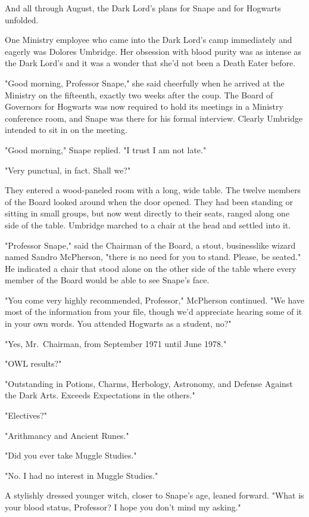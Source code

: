 And all through August, the Dark Lord's plans for Snape and for Hogwarts unfolded.

One Ministry employee who came into the Dark Lord's camp immediately and eagerly was Dolores Umbridge. Her obsession with blood purity was as intense as the Dark Lord's and it was a wonder that she'd not been a Death Eater before.

"Good morning, Professor Snape," she said cheerfully when he arrived at the Ministry on the fifteenth, exactly two weeks after the coup. The Board of Governors for Hogwarts was now required to hold its meetings in a Ministry conference room, and Snape was there for his formal interview. Clearly Umbridge intended to sit in on the meeting.

"Good morning," Snape replied. "I trust I am not late."

"Very punctual, in fact. Shall we?"

They entered a wood-paneled room with a long, wide table. The twelve members of the Board looked around when the door opened. They had been standing or sitting in small groups, but now went directly to their seats, ranged along one side of the table. Umbridge marched to a chair at the head and settled into it.

"Professor Snape," said the Chairman of the Board, a stout, businesslike wizard named Sandro McPherson, "there is no need for you to stand. Please, be seated." He indicated a chair that stood alone on the other side of the table where every member of the Board would be able to see Snape's face.

"You come very highly recommended, Professor," McPherson continued. "We have most of the information from your file, though we'd appreciate hearing some of it in your own words. You attended Hogwarts as a student, no?"

"Yes, Mr.~Chairman, from September 1971 until June 1978."

"OWL results?"

"Outstanding in Potions, Charms, Herbology, Astronomy, and Defense Against the Dark Arts. Exceeds Expectations in the others."

"Electives?"

"Arithmancy and Ancient Runes."

"Did you ever take Muggle Studies."

"No. I had no interest in Muggle Studies."

A stylishly dressed younger witch, closer to Snape's age, leaned forward. "What is your blood status, Professor? I hope you don't mind my asking."


